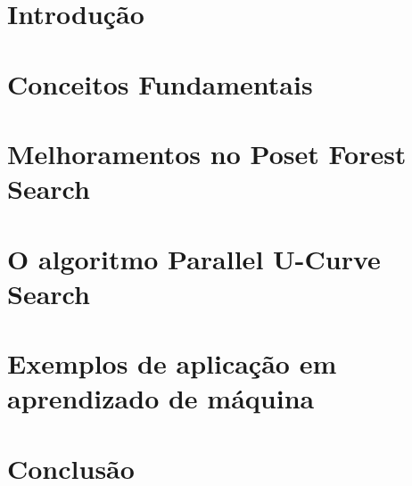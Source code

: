\documentclass[12pt, twoside]{report}
\numberwithin{mydefinition}{section}
\numberwithin{mytheorem}{section}
\numberwithin{mylemma}{section}
\begin{document}
\tableofcontents

\clearpage
{} 

\nocite{*}
\chapter{Introdução}


\chapter{Conceitos Fundamentais}


\chapter{Melhoramentos no Poset Forest Search}


\chapter{O algoritmo Parallel U-Curve Search}


\chapter{Exemplos de aplicação em aprendizado de máquina}


\chapter{Conclusão}


\newpage
\printbibliography
\end{document}
